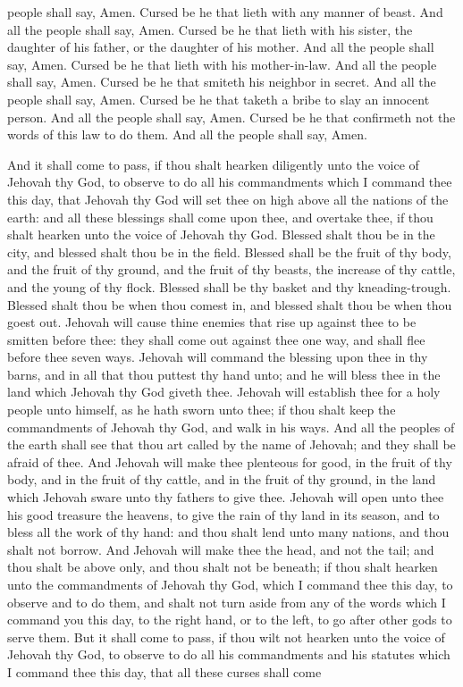 people shall say, Amen.  Cursed be he that lieth with any manner of beast. And all the people shall say, Amen.  Cursed be he that lieth with his sister, the daughter of his father, or the daughter of his mother. And all the people shall say, Amen.  Cursed be he that lieth with his mother-in-law. And all the people shall say, Amen.  Cursed be he that smiteth his neighbor in secret. And all the people shall say, Amen.  Cursed be he that taketh a bribe to slay an innocent person. And all the people shall say, Amen.  Cursed be he that confirmeth not the words of this law to do them. And all the people shall say, Amen. 

And it shall come to pass, if thou shalt hearken diligently unto the voice of Jehovah thy God, to observe to do all his commandments which I command thee this day, that Jehovah thy God will set thee on high above all the nations of the earth: and all these blessings shall come upon thee, and overtake thee, if thou shalt hearken unto the voice of Jehovah thy God. Blessed shalt thou be in the city, and blessed shalt thou be in the field. Blessed shall be the fruit of thy body, and the fruit of thy ground, and the fruit of thy beasts, the increase of thy cattle, and the young of thy flock. Blessed shall be thy basket and thy kneading-trough. Blessed shalt thou be when thou comest in, and blessed shalt thou be when thou goest out.  Jehovah will cause thine enemies that rise up against thee to be smitten before thee: they shall come out against thee one way, and shall flee before thee seven ways. Jehovah will command the blessing upon thee in thy barns, and in all that thou puttest thy hand unto; and he will bless thee in the land which Jehovah thy God giveth thee. Jehovah will establish thee for a holy people unto himself, as he hath sworn unto thee; if thou shalt keep the commandments of Jehovah thy God, and walk in his ways. And all the peoples of the earth shall see that thou art called by the name of Jehovah; and they shall be afraid of thee. And Jehovah will make thee plenteous for good, in the fruit of thy body, and in the fruit of thy cattle, and in the fruit of thy ground, in the land which Jehovah sware unto thy fathers to give thee. Jehovah will open unto thee his good treasure the heavens, to give the rain of thy land in its season, and to bless all the work of thy hand: and thou shalt lend unto many nations, and thou shalt not borrow. And Jehovah will make thee the head, and not the tail; and thou shalt be above only, and thou shalt not be beneath; if thou shalt hearken unto the commandments of Jehovah thy God, which I command thee this day, to observe and to do them, and shalt not turn aside from any of the words which I command you this day, to the right hand, or to the left, to go after other gods to serve them.  But it shall come to pass, if thou wilt not hearken unto the voice of Jehovah thy God, to observe to do all his commandments and his statutes which I command thee this day, that all these curses shall come 